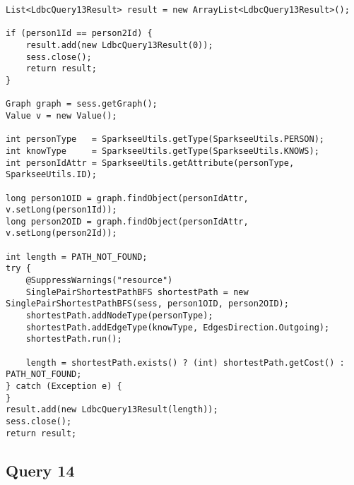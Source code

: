 {\footnotesize
\begin{verbatim}
List<LdbcQuery13Result> result = new ArrayList<LdbcQuery13Result>();

if (person1Id == person2Id) {
    result.add(new LdbcQuery13Result(0));
    sess.close();
    return result;
} 

Graph graph = sess.getGraph();
Value v = new Value();

int personType   = SparkseeUtils.getType(SparkseeUtils.PERSON);
int knowType     = SparkseeUtils.getType(SparkseeUtils.KNOWS);
int personIdAttr = SparkseeUtils.getAttribute(personType, SparkseeUtils.ID);

long person1OID = graph.findObject(personIdAttr, v.setLong(person1Id));
long person2OID = graph.findObject(personIdAttr, v.setLong(person2Id));

int length = PATH_NOT_FOUND;
try {
    @SuppressWarnings("resource")
    SinglePairShortestPathBFS shortestPath = new SinglePairShortestPathBFS(sess, person1OID, person2OID);
    shortestPath.addNodeType(personType);
    shortestPath.addEdgeType(knowType, EdgesDirection.Outgoing);
    shortestPath.run();

    length = shortestPath.exists() ? (int) shortestPath.getCost() : PATH_NOT_FOUND;
} catch (Exception e) {
}
result.add(new LdbcQuery13Result(length));
sess.close();
return result;
\end{verbatim}
}

\subsection{Query 14}

